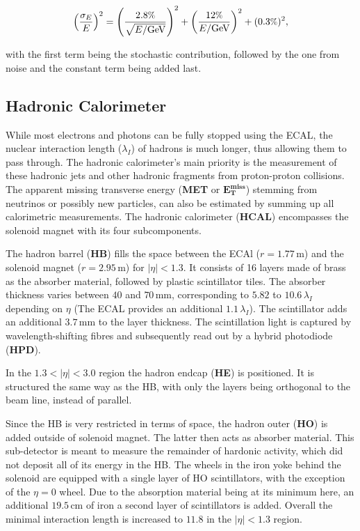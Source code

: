 \begin{equation}
  \label{eq:ecalreso}
  \left( \frac{ \sigma_E}{E} \right)^2 = \left( \frac{2.8\pct}{\sqrt{E/\text{GeV}}} \right)^2 + \left( \frac{12\pct}{E/\text{GeV}} \right)^2 + (0.3\pct)^2,
\end{equation}

\noindent with the first term being the stochastic contribution, followed by the one from noise and the constant term being added last.


\subsection{Hadronic Calorimeter}

While most electrons and photons can be fully stopped using the ECAL, the nuclear interaction length ($\lambda_I$) of hadrons is much longer, thus allowing them to pass through. The hadronic calorimeter's main priority is the measurement of these hadronic jets and other hadronic fragments from proton-proton collisions. The apparent missing transverse energy (\textbf{MET} or $\mathbf{E^{\text{miss}}_{\text{T}}}$) stemming from neutrinos or possibly new particles, can also be estimated by summing up all calorimetric measurements. The hadronic calorimeter (\textbf{HCAL}) encompasses the solenoid magnet with its four subcomponents. 

The hadron barrel (\textbf{HB}) fills the space between the ECAl ($r = 1.77\,\text{m}$) and the solenoid magnet ($r = 2.95\,\text{m}$) for $|\eta| < 1.3$. It consists of 16 layers made of brass as the absorber material, followed by plastic scintillator tiles. The absorber thickness varies between $40$ and $70\,\text{mm}$, corresponding to $5.82$ to $10.6\,\lambda_I$ depending on $\eta$ (The ECAL provides an additional $1.1\,\lambda_I$). The scintillator adds an additional $3.7\,\text{mm}$ to the layer thickness. The scintillation light is captured by wavelength-shifting fibres and subsequently read out by a hybrid photodiode (\textbf{HPD}).

In the $1.3 < |\eta| < 3.0$ region the hadron endcap (\textbf{HE}) is positioned. It is structured the same way as the HB, with only the layers being orthogonal to the beam line, instead of parallel.

Since the HB is very restricted in terms of space, the hadron outer (\textbf{HO}) is added outside of solenoid magnet. The latter then acts as absorber material. This sub-detector is meant to measure the remainder of hardonic activity, which did not deposit all of its energy in the HB. The wheels in the iron yoke behind the solenoid are equipped with a single layer of HO scintillators, with the exception of the $\eta = 0$ wheel. Due to the absorption material being at its minimum here, an additional $19.5\,\text{cm}$ of iron a second layer of scintillators is added. Overall the minimal interaction length is increased to $11.8$ in the $|\eta| < 1.3$ region.


